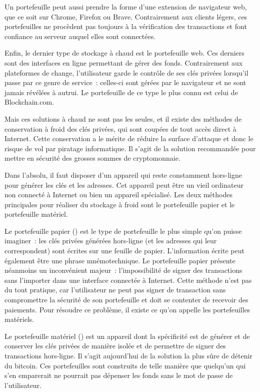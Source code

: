 Un portefeuille peut aussi prendre la forme d'une extension de navigateur web, que ce soit sur Chrome, Firefox ou Brave. Contrairement aux clients légers, ces portefeuilles ne procèdent pas toujours à la vérification des transactions et font confiance au serveur auquel elles sont connectées.

Enfin, le dernier type de stockage à chaud est le portefeuille web. Ces derniers sont des interfaces en ligne permettant de gérer des fonds. Contrairement aux plateformes de change, l'utilisateur garde le contrôle de ses clés privées lorsqu'il passe par ce genre de service~: celles-ci sont gérées par le navigateur et ne sont jamais révélées à autrui. Le portefeuille de ce type le plus connu est celui de Blockchain.com.


Mais ces solutions à chaud ne sont pas les seules, et il existe des méthodes de conservation à froid des clés privées, qui sont coupées de tout accès direct à Internet. Cette conservation a le mérite de réduire la surface d'attaque et donc le risque de vol par piratage informatique. Il s'agit de la solution recommandée pour mettre en sécurité des grosses sommes de cryptomonnaie.

Dans l'absolu, il faut disposer d'un appareil qui reste constamment hors-ligne pour générer les clés et les adresses. Cet appareil peut être un vieil ordinateur non connecté à Internet ou bien un appareil spécialisé. Les deux méthodes principales pour réaliser du stockage à froid sont le portefeuille papier et le portefeuille matériel.

Le portefeuille papier () est le type de portefeuille le plus simple qu'on puisse imaginer~: les clés privées générées hors-ligne (et les adresses qui leur correspondent) sont écrites sur une feuille de papier. L'information écrite peut également être une phrase mnémotechnique. Le portefeuille papier présente néanmoins un inconvénient majeur~: l'impossibilité de signer des transactions sans l'importer dans une interface connectée à Internet. Cette méthode n'est pas du tout pratique, car l'utilisateur ne peut pas signer de transaction sans compromettre la sécurité de son portefeuille et doit se contenter de recevoir des paiements. Pour résoudre ce problème, il existe ce qu'on appelle les portefeuilles matériels.

Le portefeuille matériel () est un appareil dont la spécificité est de générer et de conserver les clés privées de manière isolée et de permettre de signer des transactions hors-ligne. Il s'agit aujourd'hui de la solution la plus sûre de détenir du bitcoin. Ces portefeuilles sont construits de telle manière que quelqu'un qui s'en emparerait ne pourrait pas dépenser les fonds sans le mot de passe de l'utilisateur.

